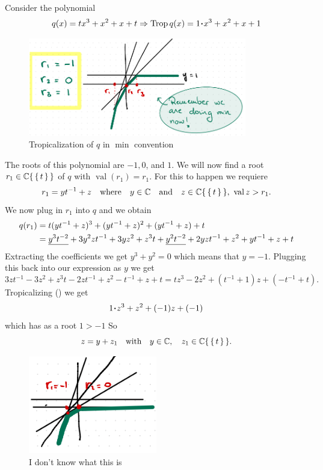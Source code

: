 \documentclass[12pt]{memoir}
\DeclareMathOperator{\val}{val}
\DeclareMathOperator{\Trop}{Trop}
\begin{document}
\begin{Ex}
    Consider the polynomial 
    $$q(x)=tx^3+x^2+x+t\To\Trop q(x)=1\.x^3+x^2+x+1$$
    \begin{figure}[h!]
        \centering
        \includegraphics[width=0.85\textwidth]{figs/fig5-1RealizabilityExampleProof.png}
        \caption{Tropicalization of $q$ in $\min$ convention}
        \label{fig:5.1-RealizabilityExampleProof}
    \end{figure}
    The roots of this polynomial are $-1,0$, and $1$. We will now find a root $r_1\in\mathbb{C}\{\,\{\,t\,\}\,\}$ of $q$ with $\val(r_1)=r_1$. For this to happen we requiere 
    $$r_1=yt^{-1}+z\word{where}y\in\bC\word{and}z\in\bC\set{\set{t}},\ \val z>r_1.$$
    We now plug in $r_1$ into $q$ and we obtain
    \begin{align*}
        q(r_1)&=t(yt^{-1}+z)^3+(yt^{-1}+z)^2+(yt^{-1}+z)+t\\
        &=\underline{y^3t^{-2}}+3y^2zt^{-1}+3yz^2+z^3t+\underline{y^2t^{-2}}+2yzt^{-1}+z^2+yt^{-1}+z+t
    \end{align*}
    Extracting the coefficients we get $y^3+y^2=0$ which means that $y=-1$. Plugging this back into our expression as $y$ we get 
    $$3zt^{-1}-3z^2+z^3t-2zt^{-1}+z^2-t^{-1}+z+t=tz^3-2z^2+(t^{-1}+1)z+(-t^{-1}+t).$$
    Tropicalizing () we get 
    $$1\.z^3+z^2+(-1)z+(-1)$$
    which has as a root $1>-1$ So 
    $$z=y+z_1\quad\text{with}\quad y\in\mathbb{C},\quad z_1\in\mathbb{C}\{\,\{\,t\,\}\,\}.$$  
    \begin{figure}[h!]
        \centering
        \includegraphics[width=0.5\textwidth]{figs/fig5-2EndOfProofFiniteCase.png}
        \caption{I don't know what this is}
        \label{fig:5.2-EndOfProofFiniteCase}
    \end{figure}
\end{Ex} 
\end{document}
